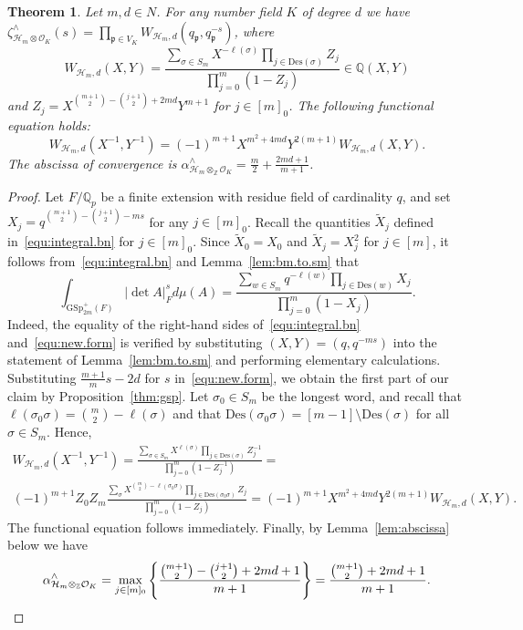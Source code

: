 \documentclass[11pt,a4paper]{amsart}
\theoremstyle{plain}
\newtheorem{thm}{Theorem}[section]
\theoremstyle{remark}
\newcommand{\Z}{\mathbb{Z}}
\newcommand{\Q}{\mathbb{Q}}
\newcommand{\tensor}{\otimes}
\newcommand{\p}{\mathfrak{p}}
\def \p {\ensuremath{\mathfrak{p}}}
\begin{document}
\begin{thm} \label{pro:higher.final}
Let $m, d \in N$.  For any number field $K$ of degree $d$ we have $\zeta^\wedge_{\mathcal{H}_m \tensor \mathcal{O}_K}(s) = \prod_{\p \in V_K} W_{\mathcal{H}_m, d}(q_\p, q_\p^{-s})$, where
\begin{equation*}
W_{\mathcal{H}_m,d}(X,Y) = \frac{\sum_{\sigma \in S_m} X^{- \ell(\sigma)} \prod_{j \in \mathrm{Des}(\sigma)} Z_j}{\prod_{j = 0}^m (1 - Z_j)} \in \Q(X,Y)
\end{equation*}
and $Z_j = X^{\binom{m+1}{2} - \binom{j+1}{2} + 2md} Y^{m+1}$ for $j \in [m]_0$.  The following functional equation holds:
\begin{equation*}
W_{\mathcal{H}_m,d}(X^{-1},Y^{-1}) = (-1)^{m+1} X^{m^2 + 4md}Y^{2(m+1)} W_{\mathcal{H}_m,d}(X,Y).
\end{equation*}
The abscissa of convergence is $\alpha^\wedge_{\mathcal{H}_m \tensor_\Z \mathcal{O}_K} = \frac{m}{2} + \frac{2md + 1}{m+1}$.
\end{thm}
\begin{proof}
Let $F/ \Q_p$ be a finite extension with residue field of cardinality $q$, and set $X_j = q^{\binom{m+1}{2} - \binom{j+1}{2} - ms}$ for any $j \in [m]_0$.
Recall the quantities $\widetilde{X}_j$ defined in~\eqref{equ:integral.bn} for $j \in [m]_0$.  Since $\widetilde{X}_0 = X_0$ and $\widetilde{X}_j = X_j^2$ for $j \in [m]$, it follows from~\eqref{equ:integral.bn} and Lemma~\ref{lem:bm.to.sm} that
\begin{equation} \label{equ:new.form}
 \int_{\mathrm{GSp}_{2m}^+(F)} | \det A |_{F}^{s} d \mu(A) =  \frac{ \sum_{w \in S_m} q^{- \ell (w)} \prod_{j \in \mathrm{Des}(w)} X_j }{\prod_{j = 0}^m (1 - X_j )} .
 \end{equation}
Indeed, the equality of the right-hand sides of~\eqref{equ:integral.bn} and~\eqref{equ:new.form} is  verified by substituting $(X,Y) = (q, q^{-ms})$ into the statement of Lemma~\ref{lem:bm.to.sm} and performing elementary calculations.
Substituting $\frac{m+1}{m} s - 2d$ for $s$ in~\eqref{equ:new.form}, we obtain the first part of our claim by Proposition~\ref{thm:gsp}.  Let $\sigma_0 \in S_m$ be the longest word, and recall that $\ell(\sigma_0 \sigma) = \binom{m}{2} - \ell(\sigma)$ and that $\mathrm{Des}(\sigma_0 \sigma) = [m-1] \setminus \mathrm{Des}(\sigma)$ for all $\sigma \in S_m$.  Hence, 
\begin{multline*}
W_{\mathcal{H}_m,d}(X^{-1}, Y^{-1}) = \frac{\sum_{\sigma \in S_m} X^{\ell(\sigma)} \prod_{j \in \mathrm{Des}(\sigma)} Z_j^{-1}}{\prod_{j = 0}^m (1 - Z_j^{-1})} = \\ (-1)^{m+1} Z_0 Z_m \frac{\sum_{\sigma} X^{\binom{m}{2} - \ell(\sigma_0 \sigma)} \prod_{j \in \mathrm{Des}(\sigma_0 \sigma)} Z_j}{\prod_{j = 0}^m (1 - Z_j)} = \!
(-1)^{m+1} X^{m^2 + 4md} Y^{2(m+1)} W_{\mathcal{H}_m,d}(X,Y).
\end{multline*}
The functional equation follows immediately.  Finally, by Lemma~\ref{lem:abscissa} below we have
$$  \alpha^\wedge_{\mathcal{H}_m \tensor_\Z \mathcal{O}_K} = \max_{j \in [m]_0} \left\{ \frac{\binom{m+1}{2} - \binom{j + 1}{2} + 2md + 1}{m+1} \right\} = \frac{\binom{m+1}{2} + 2md + 1}{m+1}.\qedhere$$ 
\end{proof}
\end{document}
